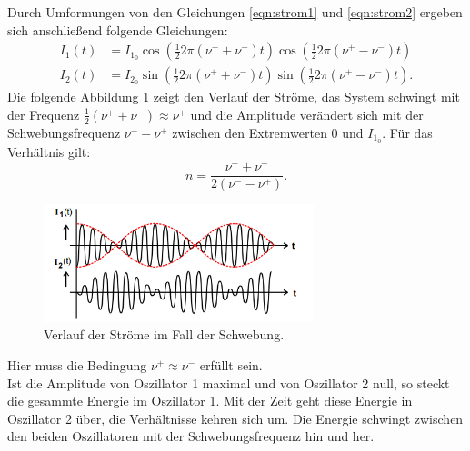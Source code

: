  Durch Umformungen von den Gleichungen \eqref{eqn:strom1} und \eqref{eqn:strom2} ergeben sich anschließend folgende Gleichungen:
 \begin{align}
   I_1(t)&=I_{1_0}\cos\left(\frac{1}{2}2\pi(\nu^{+}+\nu^{-})t\right)\cos\left(\frac{1}{2}2\pi(\nu^{+}-\nu^{-})t\right)\\
   I_2(t)&=I_{2_0}\sin\left(\frac{1}{2}2\pi(\nu^{+}+\nu^{-})t\right)\sin\left(\frac{1}{2}2\pi(\nu^{+}-\nu^{-})t\right).
  \end{align}
\newpage
Die folgende Abbildung \ref{abb:schwebung} zeigt den Verlauf der Ströme, das System schwingt mit der Frequenz $\frac{1}{2}(\nu^{+}+\nu^{-})\approx\nu^{+}$
und die Amplitude verändert sich mit der Schwebungsfrequenz $\nu^{-}-\nu^{+}$ zwischen den Extremwerten 0 und $I_{1_0}$. Für das Verhältnis gilt:\\
  \begin{equation}
    n=\frac{\nu^+ + \nu^-}{2(\nu^{-} - \nu^{+})}\label{eqn:verhaeltnis}.
  \end{equation}
  \begin{figure}[!h]
    \centering
    \includegraphics[width=0.7\textwidth]{schwebung.PNG}
    \caption{Verlauf der Ströme im Fall der Schwebung\cite{skript}.}
    \label{abb:schwebung}
    \end{figure}
  Hier muss die Bedingung $\nu^+\approx\nu^-$ erfüllt sein.
\\
  Ist die Amplitude von Oszillator 1 maximal und von Oszillator 2 null, so steckt die gesammte Energie im Oszillator 1.
  Mit der Zeit geht diese Energie in Oszillator 2 über, die Verhältnisse kehren sich um. Die Energie schwingt zwischen den beiden Oszillatoren mit der Schwebungsfrequenz hin und her.\\
